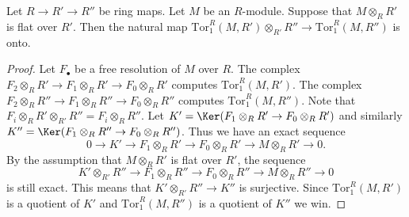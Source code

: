 \begin{lemma}
\label{lemma-surjective-on-tor-one}
Let $R \to R' \to R''$ be ring maps.
Let $M$ be an $R$-module. Suppose that $M \otimes_R R'$
is flat over $R'$. Then the natural map
$\text{Tor}_1^R(M, R') \otimes_{R'} R'' \to
\text{Tor}_1^R(M, R'')$ is onto.
\end{lemma}

\begin{proof}
Let $F_\bullet$ be a free resolution of $M$ over $R$.
The complex $F_2 \otimes_R R' \to F_1\otimes_R R' \to F_0 \otimes_R R'$
computes $\text{Tor}_1^R(M, R')$.
The complex $F_2 \otimes_R R'' \to F_1\otimes_R R'' \to F_0 \otimes_R R''$
computes $\text{Tor}_1^R(M, R'')$. Note that
$F_i \otimes_R R' \otimes_{R'} R'' = F_i \otimes_R R''$. Let
$K' = \Ker(F_1\otimes_R R' \to F_0 \otimes_R R')$ and
similarly $K'' = \Ker(F_1\otimes_R R'' \to F_0 \otimes_R R'')$.
Thus we have an exact sequence
$$
0 \to K' \to F_1\otimes_R R' \to F_0 \otimes_R R' \to M \otimes_R R' \to 0.
$$
By the assumption that $M \otimes_R R'$ is flat over $R'$,
the sequence
$$
K' \otimes_{R'} R'' \to
F_1 \otimes_R R'' \to
F_0 \otimes_R R'' \to
M \otimes_R R'' \to 0
$$
is still exact. This means that $K' \otimes_{R'} R'' \to K''$
is surjective. Since $\text{Tor}_1^R(M, R')$ is a quotient of $K'$ and
$\text{Tor}_1^R(M, R'')$ is a quotient of $K''$ we win.
\end{proof}
